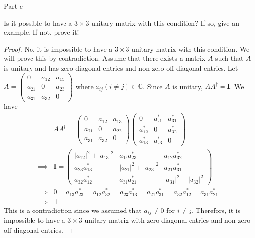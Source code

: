 \begin{solution}{Part c}\label{ques:1c}
  \begin{question}
    Is it possible to have a $3 \times 3$ unitary matrix with this condition? If so, give an example. If not, prove it!
  \end{question}
  \tcblower{}
  \begin{proof}
    No, it is impossible to have a $3\times 3$ unitary matrix with this condition. We will prove this by contradiction. Assume that there exists a matrix $A$ such that $A$ is unitary and has zero diagonal entries and non-zero off-diagonal entries. Let $A = \begin{pmatrix}
      0 & a_{12} & a_{13}\\
      a_{21} & 0 & a_{23}\\
      a_{31} & a_{32} & 0
    \end{pmatrix}$ where $a_{ij} (i \neq j) \in \mathbb{C}$. Since $A$ is unitary, $AA^\dagger = \mathbf{I}$. We have
    \begin{equation}
      \begin{split}
        &AA^\dagger = \begin{pmatrix}
          0 & a_{12} & a_{13}\\
          a_{21} & 0 & a_{23}\\
          a_{31} & a_{32} & 0
        \end{pmatrix}\begin{pmatrix}
          0 & a_{21}^* & a_{31}^*\\
          a_{12}^* & 0 & a_{32}^*\\
          a_{13}^* & a_{23}^* & 0
        \end{pmatrix}\\
        \implies &\mathbf{I} = \begin{pmatrix}
          |a_{12}|^2 + |a_{13}|^2 & a_{13}a_{23}^* & a_{12}a_{32}^*\\
          a_{23}a_{13}^* & |a_{21}|^2 + |a_{23}|^2 & a_{21}a_{31}^*\\
          a_{32}a_{12}^* & a_{31}a_{21}^* & |a_{31}|^2 + |a_{32}|^2
        \end{pmatrix}\\
        \implies &0 = a_{13}a_{23}^* = a_{12}a_{32}^* = a_{23}a_{13}^* = a_{21}a_{31}^* = a_{32}a_{12}^* = a_{31}a_{21}^*\\
        \implies &\bot
      \end{split}
    \end{equation}
    This is a contradiction since we assumed that $a_{ij} \neq 0$ for $i \neq j$. Therefore, it is impossible to have a $3\times 3$ unitary matrix with zero diagonal entries and non-zero off-diagonal entries.
  \end{proof}
\end{solution}
